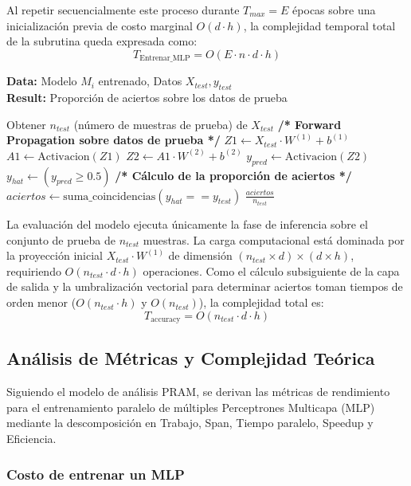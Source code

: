 \documentclass[11pt, a4paper]{article}
\begin{document}
Al repetir secuencialmente este proceso durante $T_{max} = E$ épocas sobre una inicialización previa de costo marginal $O(d \cdot h)$, la complejidad temporal total de la subrutina queda expresada como:
$$T_{\text{Entrenar\_MLP}} = O(E \cdot n \cdot d \cdot h)$$

\begin{algorithm}[H]
\caption{Evaluación del modelo (accuracy)}
\textbf{Data:} Modelo $M_i$ entrenado, Datos $X_{test}, y_{test}$\\
\textbf{Result:} Proporción de aciertos sobre los datos de prueba
\begin{algorithmic}[1]
    \State Obtener $n_{test}$ (número de muestras de prueba) de $X_{test}$
    \State \textbf{/* Forward Propagation sobre datos de prueba */}
    \State $Z1 \gets X_{test} \cdot W^{(1)} + b^{(1)}$
    \State $A1 \gets \text{Activacion}(Z1)$ 
    \State $Z2 \gets A1 \cdot W^{(2)} + b^{(2)}$ 
    \State $y_{pred} \gets \text{Activacion}(Z2)$
    \Statex
    \State $y_{hat} \gets (y_{pred} \ge 0.5)$
    \State \textbf{/* Cálculo de la proporción de aciertos */}
    \State $aciertos \gets \text{suma\_coincidencias}(y_{hat} == y_{test})$
    \State \Return $\frac{aciertos}{n_{test}}$
\end{algorithmic}
\end{algorithm}

La evaluación del modelo ejecuta únicamente la fase de inferencia sobre el conjunto de prueba de $n_{test}$ muestras. La carga computacional está dominada por la proyección inicial $X_{test} \cdot W^{(1)}$ de dimensión $(n_{test} \times d) \times (d \times h)$, requiriendo $O(n_{test} \cdot d \cdot h)$ operaciones. Como el cálculo subsiguiente de la capa de salida y la umbralización vectorial para determinar aciertos toman tiempos de orden menor ($O(n_{test} \cdot h)$ y $O(n_{test})$), la complejidad total es:
$$T_{\text{accuracy}} = O(n_{test} \cdot d \cdot h)$$


\subsection{Análisis de Métricas y Complejidad Teórica}

Siguiendo el modelo de análisis PRAM, se derivan las métricas de rendimiento para el entrenamiento paralelo de múltiples Perceptrones Multicapa (MLP) mediante la descomposición en Trabajo, Span, Tiempo paralelo, Speedup y Eficiencia.

\subsubsection{Costo de entrenar un MLP}
\end{document}
